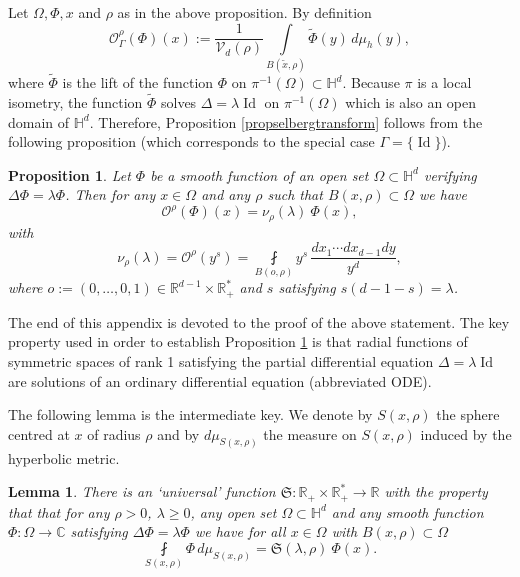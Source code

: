 \documentclass[JEP,XML,SOM,Unicode,NoFloatCountersInSection,published]{cedram}
\let\mathcal\mathscr
\theoremstyle{plain}
\newtheorem{proposition}[equation]{Proposition}
\newtheorem{lemma}[equation]{Lemma}
\theoremstyle{definition}
\newcommand{\HH}{\mathbb{H}}
\newcommand{\RR}{\mathbb{R}}
\newcommand{\CC}{\mathbb{C}}
\newcommand{\inte}[1]{\underset{#1}{\int}}
\newcommand{\finte}[3]{\underset{#1}{\fint} {#2} \, {#3}}
\DeclareMathOperator{\Id}{Id}
\begin{document}
Let $\Omega, \Phi, x$ and $\rho$ as in the above proposition. By definition
\[
\mathcal{O}^{\rho}_{\Gamma}(\Phi)(x) := \frac{1}{\mathcal{V}_d(\rho)} \inte{B(\tilde{x},\rho)} \tilde{\Phi}(y) \,d \mu_h(y),
\]
where $\tilde{\Phi}$ is the lift of the function $\Phi$ on $\pi^{-1}(\Omega) \subset \HH^d$. Because $\pi$ is a local isometry, the function $\tilde{\Phi}$ solves $\Delta = \lambda \Id$ on $\pi^{-1}(\Omega)$ which is also an open domain of $\HH^d$. Therefore, Proposition \ref{propselbergtransform} follows from the following proposition (which corresponds to the special case $\Gamma = \{\Id\}$).

\begin{proposition}
\label{propselbergprepretrace}
Let $\Phi$ be a smooth function of an open set $\Omega \subset \HH^d$ verifying $\Delta \Phi = \lambda \Phi$. Then for any $x \in \Omega$ and any $\rho$ such that $B(x,\rho) \subset \Omega$ we have
\begin{equation*}
\mathcal{O}^{\rho}(\Phi)(x) = \nu_{\rho}(\lambda) \ \Phi(x),
\end{equation*}
with
\begin{equation*}
\nu_{\rho}(\lambda) = \mathcal{O}^{\rho}(y^s) = \finte{B(o,\rho)} { y^s}{ \frac{dx_1\cdots dx_{d-1} dy}{y^d}},
\end{equation*}
where $o := (0,\dots, 0, 1) \in \RR^{d-1} \times \RR_+^*$ and $s$ satisfying $s(d-1-s) = \lambda$.
\end{proposition}

The end of this appendix is devoted to the proof of the above statement. The key property used in order to establish Proposition \ref{propselbergprepretrace} is that radial functions of symmetric spaces of rank 1 satisfying the partial differential equation $\Delta = \lambda \Id$ are solutions of an ordinary differential equation (abbreviated ODE).

The following lemma is the intermediate key. We denote by $S(x,\rho)$ the sphere centred at $x$ of radius $\rho$ and by $d \mu_{S(x,\rho)}$ the measure on $S(x,\rho)$ induced by the hyperbolic metric.

\begin{lemma}
\label{lemmaappendix2}
There is an `universal' function $\mathfrak{S} : \RR_+ \times \RR_+^* \to \RR$ with the property that that for any $\rho >0$, $\lambda \ge 0$, any open set $\Omega \subset \HH^d$ and any smooth function $\Phi : \Omega \to \CC$ satisfying $\Delta \Phi = \lambda \Phi$ we have for all $x \in \Omega$ with $B(x,\rho) \subset \Omega$
\[
\finte{S(x, \rho)}{\Phi}{ d \mu_{S(x,\rho)}} = \mathfrak{S}(\lambda,\rho) \ \Phi(x).
\]
\end{lemma}
\end{document}
